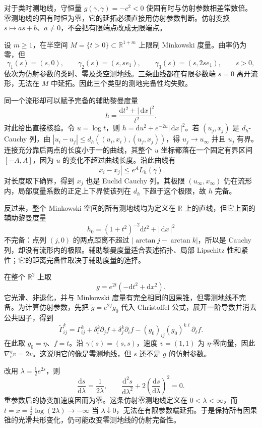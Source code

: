 对于类时测地线，守恒量 \(g(\dot\gamma,\dot\gamma)=-c^2<0\) 使固有时与仿射参数相差常数倍。零测地线的固有时恒为零，它的延拓必须直接用仿射参数判断。仿射变换 \(s\mapsto as+b\)、\(a\ne0\)，不会把有限端点改成无限端点。

\begin{example}\label{g3:exm:A-half-minkowski-completeness}
	设 \(m\ge1\)，在半空间 \(M=\{t>0\}\subset\mathbb R^{1+m}\) 上限制 Minkowski 度量。曲率仍为零，但
	\[
		\gamma_1(s)=(s,0),\qquad
		\gamma_2(s)=(s,se_1),\qquad
		\gamma_3(s)=(s,2se_1),\qquad s>0,
	\]
	依次为仿射参数的类时、零及类空测地线。三条曲线都在有限参数端 \(s=0\) 离开流形，无法在 \(M\) 中延拓。因此三个类型的测地完备性均失败。

	\ProseParagraphBreak
	同一个流形却可以赋予完备的辅助黎曼度量
	\[
		h=\frac{\mathrm dt^2+|\,\mathrm dx\,|^2}{t^2}.
	\]
	对此给出直接核验。令 \(u=\log t\)，则
	\(h=\mathrm du^2+e^{-2u}|\,\mathrm dx\,|^2\)。若 \((u_j,x_j)\) 是 \(d_h\)-Cauchy 列，由
	\(|u_i-u_j|\le d_h((u_i,x_i),(u_j,x_j))\)，得 \(u_j\to u_\infty\) 并且 \(u_j\) 有界。连接充分靠后两点的长度小于一的曲线，其整个 \(u\) 坐标都落在一个固定有界区间 \([-A,A]\)，因为 \(u\) 的变化不超过曲线长度。沿此曲线有
	\[
		|x_i-x_j|\le e^A L_h(\gamma).
	\]
	对长度取下确界，得到 \(x_j\) 也是 Euclid Cauchy 列。其极限 \((u_\infty,x_\infty)\) 仍在流形内，局部度量系数的正定上下界使该列在 \(d_h\) 下趋于这个极限，故 \(h\) 完备。
\end{example}

反过来，整个 Minkowski 空间的所有测地线均为定义在 \(\mathbb R\) 上的直线，但它上面的辅助黎曼度量
\[
	h_0=(1+t^2)^{-2}\mathrm dt^2+|\,\mathrm dx\,|^2
\]
不完备：点列 \((j,0)\) 的两点距离不超过
\(|\arctan j-\arctan k|\)，所以是 Cauchy 列，却没有流形内的极限。辅助黎曼度量适合表述拓扑、局部 Lipschitz 性和紧性；它的距离完备性取决于辅助度量的选择。

\begin{example}\label{g3:exm:A-conformal-null-incomplete}
	在整个 \(\mathbb R^2\) 上取
	\[
		g=e^{2t}(-\mathrm dt^2+\mathrm dx^2).
	\]
	它光滑、非退化，并与 Minkowski 度量有完全相同的因果锥，但零测地线不完备。为计算仿射参数，先把 \(\widetilde g=e^{2f}g_0\) 代入 Christoffel 公式，展开一阶导数并消去公共因子，得到
	\[
		\widetilde\Gamma^k_{ij}
		=\Gamma^k_{ij}
		+\delta^k_i\partial_jf+\delta^k_j\partial_if
		-(g_0)_{ij}(g_0)^{k\ell}\partial_\ell f.
	\]
	在此取 \(g_0=\eta\)、\(f=t\)。沿 \(\gamma(s)=(s,s)\)，速度 \(v=(1,1)\) 为 \(\eta\)-零向量，因此
	\(\nabla^g_vv=2v\)。这说明它的像是零测地线，但 \(s\) 还不是 \(g\) 的仿射参数。

	\ProseParagraphBreak
	改用 \(\lambda=\tfrac12e^{2s}\)，则
	\[
		\frac{\mathrm ds}{\mathrm d\lambda}=\frac1{2\lambda},
		\qquad
		\frac{\mathrm d^2s}{\mathrm d\lambda^2}
		 +2\left(\frac{\mathrm ds}{\mathrm d\lambda}\right)^2=0.
	\]
	重参数后的协变加速度因而为零。这条仿射零测地线定义在 \(0<\lambda<\infty\)，而
	\(t=x=\tfrac12\log(2\lambda)\to-\infty\) 当 \(\lambda\downarrow0\)，无法在有限参数端延拓。于是保持所有因果锥的光滑共形变化，仍可能改变零测地线的仿射完备性。
\end{example}

